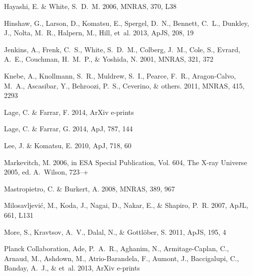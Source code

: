 \documentclass[useAMS, usenatbib]{mn2e}
\newcommand{\apj}{ApJ}
\newcommand{\apjl}{ApJL}
\newcommand{\apjs}{ApJS}
\newcommand{\mnras}{MNRAS}
\begin{document}
{\begin{thebibliography}{30}
{Hayashi}, E. \& {White}, S.~D.~M. 2006, \mnras, 370, L38

{Hinshaw}, G., {Larson}, D., {Komatsu}, E., {Spergel}, D.~N., {Bennett}, C.~L.,
  {Dunkley}, J., {Nolta}, M.~R., {Halpern}, M., {Hill}, {et~al.} 2013, \apjs,
  208, 19

{Jenkins}, A., {Frenk}, C.~S., {White}, S.~D.~M., {Colberg}, J.~M., {Cole}, S.,
  {Evrard}, A.~E., {Couchman}, H.~M.~P., \& {Yoshida}, N. 2001, \mnras, 321,
  372

{Knebe}, A., {Knollmann}, S.~R., {Muldrew}, S.~I., {Pearce}, F.~R.,
  {Aragon-Calvo}, M.~A., {Ascasibar}, Y., {Behroozi}, P.~S., {Ceverino}, \&
  others. 2011, \mnras, 415, 2293

{Lage}, C. \& {Farrar}, F. 2014{}, ArXiv e-prints

{Lage}, C. \& {Farrar}, G. 2014{}, \apj, 787, 144

{Lee}, J. \& {Komatsu}, E. 2010, \apj, 718, 60

{Markevitch}, M. 2006, in ESA Special Publication, Vol. 604, The X-ray Universe
  2005, ed. {A.~Wilson}, 723--+

{Mastropietro}, C. \& {Burkert}, A. 2008, \mnras, 389, 967

{Milosavljevi{\'c}}, M., {Koda}, J., {Nagai}, D., {Nakar}, E., \& {Shapiro},
  P.~R. 2007, \apjl, 661, L131

{More}, S., {Kravtsov}, A.~V., {Dalal}, N., \& {Gottl{\"o}ber}, S. 2011, \apjs,
  195, 4

{Planck Collaboration}, {Ade}, P.~A.~R., {Aghanim}, N., {Armitage-Caplan}, C.,
  {Arnaud}, M., {Ashdown}, M., {Atrio-Barandela}, F., {Aumont}, J.,
  {Baccigalupi}, C., {Banday}, A.~J., \& et~al. 2013, ArXiv e-prints


\end{thebibliography}}
\end{document}
